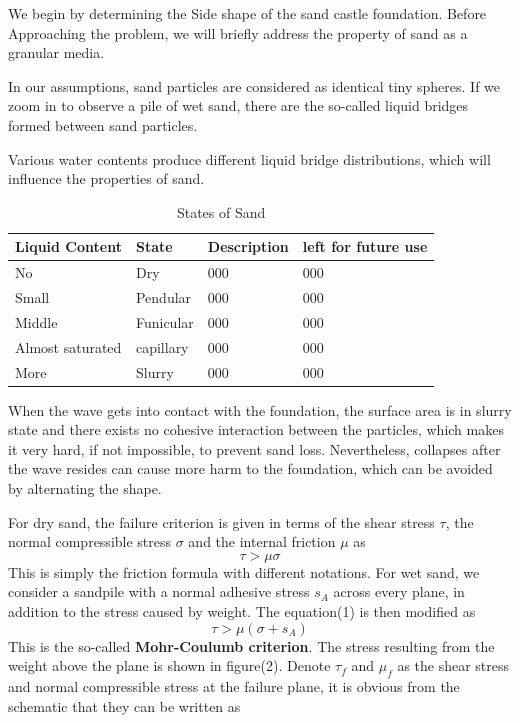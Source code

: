 \documentclass[12pt]{article}
\begin{document}
We begin by determining the Side shape of the sand castle foundation. Before Approaching the problem, we will briefly address the property of sand as a granular media.
\par
In our assumptions, sand particles are considered as identical tiny spheres. If we zoom in to observe a pile of wet sand, there are the so-called liquid bridges formed between sand particles.
\par
Various water contents produce different liquid bridge distributions, which will influence the properties of sand.

\begin{table}[H]
	\caption{States of Sand}
	\vspace{10pt}
	\centering
	\begin{tabular}{p{4cm}p{2cm}p{4cm}p{4cm}}
		\hline
		Liquid Content & State & Description & left for future use \\
		\hline
		No  			  & Dry   	    & 000          & 000                    \\
		Small  			  & Pendular    & 000     	   & 000                        \\
		Middle  		  & Funicular   & 000    	   & 000                        \\
		Almost saturated  & capillary & 000          & 000                        \\
		More  			  & Slurry      & 000          & 000                        \\  
		\hline       
	\end{tabular}
	\label{bs2}
\end{table}
\par
When the wave gets into contact with the foundation, the surface area is in slurry state and there exists no cohesive interaction between the particles, which makes it very hard, if not impossible, to prevent sand loss. Nevertheless, collapses after the wave resides can cause more harm to the foundation, which can be avoided by alternating the shape.
\par 
For dry sand, the failure criterion is given in terms of the shear stress $\tau$, the normal compressible stress $\sigma$ and the internal friction $\mu$ as
$$\tau > \mu\sigma$$
This is simply the friction formula with different notations. For wet sand, we consider a sandpile with a normal adhesive stress $s_A$ across every plane, in addition to the stress caused by weight. The equation(1) is then modified as
$$\tau > \mu(\sigma + s_A)$$
This is the so-called \textbf{Mohr-Coulumb criterion}. The stress resulting from the weight above the plane is shown in figure(2). Denote $\tau_f$ and $\mu_f$ as the shear stress and normal compressible stress at the failure plane, it is obvious from the schematic that they can be written as
\end{document}
